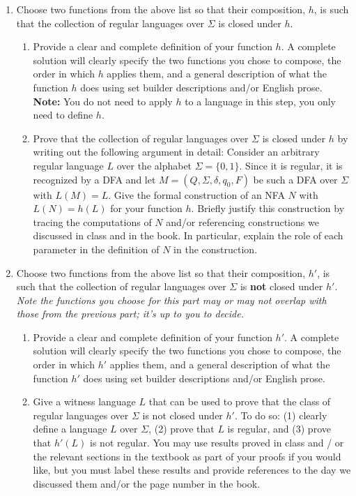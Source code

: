 \documentclass[12pt, oneside]{article}
\begin{document}
	
	\begin{enumerate}
		\item Choose two functions from the above list so that their 
		composition, $h$, is such that the collection of regular languages over $\Sigma$ is closed under $h$.
		
		\begin{enumerate}
			\item Provide a clear and complete definition of  your function $h$.
			A complete solution will clearly specify the two functions you chose to compose, 
			the order in which $h$ applies them, and a general description of what the function $h$ does using set builder
			descriptions and/or English prose.
			{\bf Note:} You do not need to apply $h$ to a language in this step, you only need to define $h$.
			\item Prove that the collection of regular languages over $\Sigma$ is 
			closed under $h$ by writing out the following argument in detail: 
			Consider an arbitrary regular language $L$ over the alphabet $\Sigma = \{0, 1\}$.
			Since it is regular, it is recognized by a DFA and let $M = (Q, \Sigma, \delta, q_0, F)$ 
			be such a DFA over $\Sigma$ with $L(M) = L$. 
			Give the formal construction of an NFA $N$ with $L(N) = h(L)$ for your function $h$.
			Briefly justify this construction by tracing the computations of $N$ and/or referencing constructions
			we discussed in class and in the book. In particular, explain the role of each parameter in the definition of $N$ in 
			the construction.
		\end{enumerate}
		
		\item Choose two functions from the above list so that their composition, $h'$, 
		is such that the collection of regular languages over $\Sigma$ is {\bf not} closed under $h'$. 
		{\it Note the functions you choose for this part may or may not overlap with those from the previous part; it's up to you to decide.}
		
		\begin{enumerate}
			\item Provide a clear and complete definition of  your function $h'$.
			A complete solution will clearly specify the two functions you chose to compose, 
			the order in which $h'$ applies them, and a general description of what 
			the function $h'$ does using set builder
			descriptions and/or English prose.			
			\item Give a witness language $L$ that can be used to prove that the class of regular
			languages over $\Sigma$ is not closed under $h'$. To do so: 
			(1) clearly define a language $L$ over $\Sigma$, (2) prove that $L$ is regular, and (3) prove that $h'(L)$ is not regular.
			You may use results proved in class and / or the relevant sections in the textbook as part of your proofs 
			if you would like, but you must label these results and provide references to the day we discussed them and/or the 
			page number in the book.
		\end{enumerate}
	\end{enumerate}
		
\end{document}
